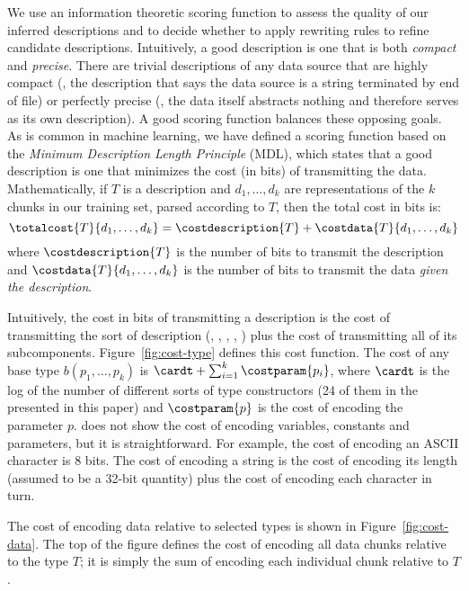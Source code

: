 We use an information theoretic scoring function to assess the quality of 
our inferred descriptions and to decide whether to apply
rewriting rules to refine candidate descriptions.
Intuitively, a good description is one that is both {\em compact} and
{\em precise}.  There are trivial descriptions of any data source
that are highly compact (\eg{}, the description that says
the data source is a string terminated by end of file) or
perfectly precise (\eg{}, the data itself abstracts nothing and
therefore serves as its own description).  A good scoring function
balances these opposing goals.  As is common
in machine learning, we have defined a scoring function based on the
{\em Minimum Description Length Principle} (MDL), which states that
a good description is one that minimizes the cost (in bits) of transmitting
the data.  Mathematically,
if $T$ is a description and $d_1,\ldots,d_k$ are representations of
the $k$ chunks in our training set, parsed according to $T$, then the 
total cost in bits is:
\[
\totalcost{T}{d_1,\ldots,d_k} = \costdescription{T} + \costdata{T}{d_1,\ldots,d_k}
\]
where $\costdescription{T}$ is the number of bits to transmit the
description and $\costdata{T}{d_1,\ldots,d_k}$ is the number of bits
to transmit the data {\em given the description}.

Intuitively, the cost in bits of transmitting a description
is the cost of transmitting the sort of description (\ie{}, ,
, , \etc{}) plus the cost of transmitting all of its
subcomponents.  Figure~\ref{fig:cost-type} defines this cost function.
The cost of any base type
$b(p_1,\ldots,p_k)$ is $ \cardt + \sum_{i=1}^{k} \costparam{p_i}$,
where $\cardt$ is the log of the number of different sorts of type 
constructors (24 of them in the \ir{} presented in this paper)
and $\costparam{p}$ is the cost of encoding the parameter $p$.
 does not show the
cost of encoding variables, constants and parameters, but it is
straightforward.  For example, the cost of 
encoding an ASCII character is 8 bits.  The cost of encoding a string
is the cost of encoding its length (assumed to be a 32-bit quantity)
plus the cost of encoding each character in turn.

The cost of encoding data relative to selected types is shown in 
Figure~\ref{fig:cost-data}.  The top of the figure defines
the cost of encoding all data chunks relative to the type $T$; it is
simply the sum of encoding each individual chunk relative to $T$.  

